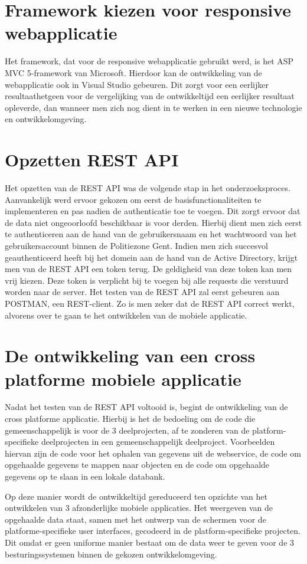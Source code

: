 \section{Framework kiezen voor responsive webapplicatie}
Het framework, dat voor de responsive webapplicatie gebruikt werd, is het ASP MVC 5-framework van Microsoft.
Hierdoor kan de ontwikkeling van de webapplicatie ook in Visual Studio gebeuren. Dit zorgt voor een eerlijker resultaathetgeen voor de vergelijking van de ontwikkeltijd
een eerlijker resultaat opleverde, dan wanneer men zich nog dient in te werken in een nieuwe technologie en ontwikkelomgeving.

\section{Opzetten REST API}
Het opzetten van de REST API was de volgende stap in het onderzoeksproces. Aanvankelijk werd ervoor gekozen om eerst de basisfunctionaliteiten te implementeren en
pas nadien de authenticatie toe te voegen. Dit zorgt ervoor dat de data niet ongeoorloofd beschikbaar is voor derden.
Hierbij dient men zich eerst te authenticeren aan de hand van de gebruikersnaam en het wachtwoord van het gebruikersaccount binnen de Politiezone Gent.
Indien men zich succesvol geauthenticeerd heeft bij het domein aan de hand van de Active Directory, krijgt men van de REST API een token terug. De geldigheid van deze token kan men vrij kiezen.
Deze token is verplicht bij te voegen bij alle requests die verstuurd worden naar de server.
Het testen van de REST API zal eerst gebeuren aan POSTMAN, een REST-client. Zo is men zeker dat de REST API correct werkt, alvorens over te gaan te het ontwikkelen van de mobiele applicatie.

\section{De ontwikkeling van een cross platforme mobiele applicatie}
Nadat het testen van de REST API voltooid is, begint de ontwikkeling van de cross platforme applicatie.
Hierbij is het de bedoeling om de code die gemeenschappelijk is voor de 3 deelprojecten, af te zonderen van de platform-specifieke deelprojecten in een gemeenschappelijk deelproject.
Voorbeelden hiervan zijn de code voor het ophalen van gegevens uit de webservice, de code om opgehaalde gegevens te mappen naar objecten en de code om opgehaalde gegevens op te slaan in een lokale databank.

 Op deze manier wordt de ontwikkeltijd gereduceerd ten opzichte van het ontwikkelen van 3 afzonderlijke mobiele applicaties.
Het weergeven van de opgehaalde data staat, samen met het ontwerp van de schermen voor de platforme-specifieke user interfaces,
 gecodeerd in de platform-specifieke projecten. Dit omdat er geen uniforme manier bestaat om de data weer te geven voor de 3 besturingssystemen binnen
de gekozen ontwikkelomgeving.

